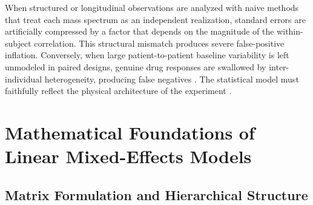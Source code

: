 \documentclass[11pt,twoside,openright]{book}
\begin{document}
When structured or longitudinal observations are analyzed with naive methods that treat each mass spectrum as an independent realization, standard errors are artificially compressed by a factor that depends on the magnitude of the within-subject correlation. This structural mismatch produces severe false-positive inflation. Conversely, when large patient-to-patient baseline variability is left unmodeled in paired designs, genuine drug responses are swallowed by inter-individual heterogeneity, producing false negatives \cite{broadhurst2006statistical}. The statistical model must faithfully reflect the physical architecture of the experiment \cite{cox2014maxlfq, demichev2020dia, choi2014msstats, huang2020msstatstmt}.

\section{Mathematical Foundations of Linear Mixed-Effects Models}

\subsection{Matrix Formulation and Hierarchical Structure}
\end{document}
